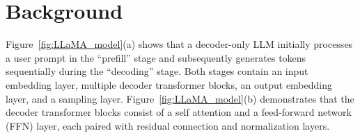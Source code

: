 \section{Background} \label{section:LLM}


Figure~\ref{fig:LLaMA_model}(a) shows that a decoder-only LLM initially processes a user prompt in the “prefill” stage and subsequently generates tokens sequentially during the “decoding” stage.
Both stages contain an input embedding layer, multiple decoder transformer blocks, an output embedding layer, and a sampling layer.
Figure~\ref{fig:LLaMA_model}(b) demonstrates that the decoder transformer blocks consist of a self attention and a feed-forward network (FFN) layer, each paired with residual connection and normalization layers. 





